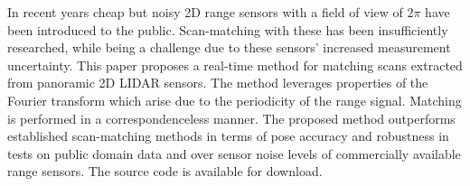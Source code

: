 In recent years cheap but noisy 2D range sensors with a field of view of $2\pi$
have been introduced to the public. Scan-matching with these has been
insufficiently researched, while being a challenge due to these sensors'
increased measurement uncertainty. This paper proposes a real-time method for
matching scans extracted from panoramic 2D LIDAR sensors. The method leverages
properties of the Fourier transform which arise due to the periodicity of the
range signal.  Matching is performed in a correspondenceless manner. The
proposed method outperforms established scan-matching methods in terms of pose
accuracy and robustness in tests on public domain data and over sensor noise
levels of commercially available range sensors. The source code is available
for download.
